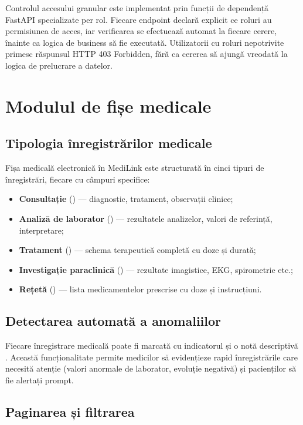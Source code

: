 Controlul accesului granular este implementat prin funcții de dependență FastAPI specializate per rol. Fiecare endpoint declară explicit ce roluri au permisiunea de acces, iar verificarea se efectuează automat la fiecare cerere, înainte ca logica de business să fie executată. Utilizatorii cu roluri nepotrivite primesc răspunsul HTTP 403 Forbidden, fără ca cererea să ajungă vreodată la logica de prelucrare a datelor.

\section{Modulul de fișe medicale}

\subsection{Tipologia înregistrărilor medicale}

Fișa medicală electronică în MediLink este structurată în cinci tipuri de înregistrări, fiecare cu câmpuri specifice:

\begin{itemize}
  \item \textbf{Consultație} () — diagnostic, tratament, observații clinice;
  \item \textbf{Analiză de laborator} () — rezultatele analizelor, valori de referință, interpretare;
  \item \textbf{Tratament} () — schema terapeutică completă cu doze și durată;
  \item \textbf{Investigație paraclinică} () — rezultate imagistice, EKG, spirometrie etc.;
  \item \textbf{Rețetă} () — lista medicamentelor prescrise cu doze și instrucțiuni.
\end{itemize}

\subsection{Detectarea automată a anomaliilor}

Fiecare înregistrare medicală poate fi marcată cu indicatorul  și o notă descriptivă . Această funcționalitate permite medicilor să evidențieze rapid înregistrările care necesită atenție (valori anormale de laborator, evoluție negativă) și pacienților să fie alertați prompt.

\subsection{Paginarea și filtrarea}

